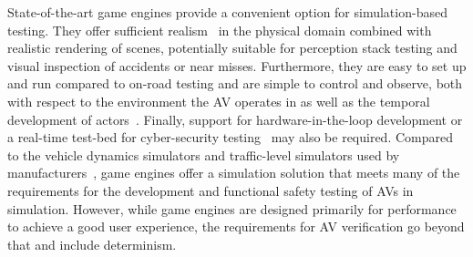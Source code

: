\documentclass[letterpaper, 10 pt, journal, twoside]{IEEEtran}
\begin{document}
State-of-the-art game engines provide a convenient option for simulation-based testing. They offer sufficient realism~\cite{Koopman2018} in the physical domain combined with realistic rendering of scenes, potentially suitable for perception stack testing and visual inspection of accidents or near misses. 
%
Furthermore, they are easy to set up and run compared to on-road testing and are simple to control and observe, both with respect to the environment the AV operates in as well as the temporal development of actors~\cite{Ulbrich2015}. 
%
% 
%
Finally, support for hardware-in-the-loop development or a real-time test-bed for cyber-security testing~\cite{Javaid2013} may also be required. %
%
%
Compared to the vehicle dynamics simulators and traffic-level simulators used by manufacturers~\cite{FrameworkAndChallenges}, game engines offer a simulation solution that meets many of the requirements for the development and functional safety testing of AVs in simulation. 
%
However, while game engines are designed primarily for performance to achieve a good user experience, the requirements for AV verification go beyond that and include determinism.
\end{document}
